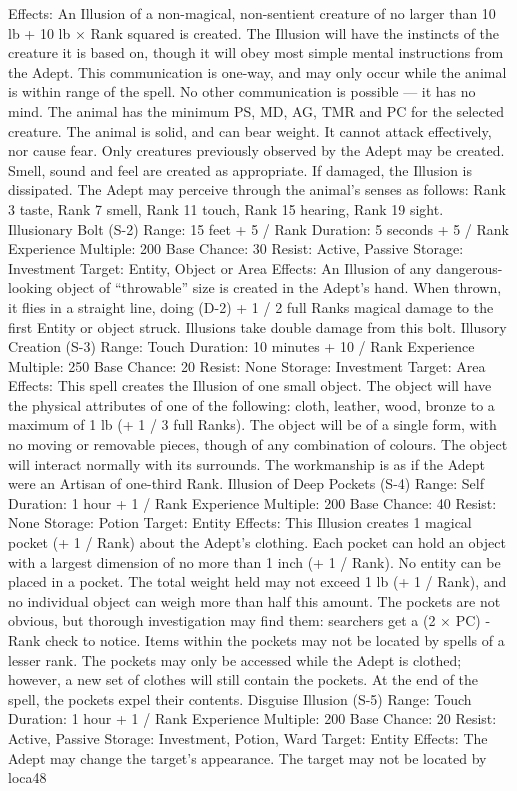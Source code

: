 \documentclass[a4paper]{article}
\begin{document}
\begin{multicols}{3}
Effects: An Illusion of a non-magical, non-sentient
creature of no larger than 10 lb + 10 lb × Rank
squared is created. The Illusion will have the instincts of the creature it is based on, though it will
obey most simple mental instructions from the
Adept. This communication is one-way, and may
only occur while the animal is within range of the
spell. No other communication is possible — it has
no mind. The animal has the minimum PS, MD,
AG, TMR and PC for the selected creature. The
animal is solid, and can bear weight. It cannot
attack effectively, nor cause fear. Only creatures
previously observed by the Adept may be created.
Smell, sound and feel are created as appropriate. If
damaged, the Illusion is dissipated. The Adept may
perceive through the animal’s senses as follows:
Rank 3 taste, Rank 7 smell, Rank 11 touch, Rank
15 hearing, Rank 19 sight.
Illusionary Bolt (S-2)
Range: 15 feet + 5 / Rank
Duration: 5 seconds + 5 / Rank
Experience Multiple: 200
Base Chance: 30%
Resist: Active, Passive
Storage: Investment
Target: Entity, Object or Area
Effects: An Illusion of any dangerous-looking
object of “throwable” size is created in the Adept’s
hand. When thrown, it flies in a straight line, doing
(D-2) + 1 / 2 full Ranks magical damage to the first
Entity or object struck. Illusions take double damage from this bolt.
Illusory Creation (S-3)
Range: Touch
Duration: 10 minutes + 10 / Rank
Experience Multiple: 250
Base Chance: 20%
Resist: None
Storage: Investment
Target: Area
Effects: This spell creates the Illusion of one small
object. The object will have the physical attributes
of one of the following: cloth, leather, wood,
bronze to a maximum of 1 lb (+ 1 / 3 full Ranks).
The object will be of a single form, with no moving or removable pieces, though of any combination of colours. The object will interact normally
with its surrounds. The workmanship is as if the
Adept were an Artisan of one-third Rank.
Illusion of Deep Pockets (S-4)
Range: Self
Duration: 1 hour + 1 / Rank
Experience Multiple: 200
Base Chance: 40%
Resist: None
Storage: Potion
Target: Entity
Effects: This Illusion creates 1 magical pocket (+ 1
/ Rank) about the Adept’s clothing. Each pocket
can hold an object with a largest dimension of no
more than 1 inch (+ 1 / Rank). No entity can be
placed in a pocket. The total weight held may not
exceed 1 lb (+ 1 / Rank), and no individual object
can weigh more than half this amount. The pockets
are not obvious, but thorough investigation may
find them: searchers get a (2 × PC) - Rank check to
notice. Items within the pockets may not be located
by spells of a lesser rank. The pockets may only be
accessed while the Adept is clothed; however, a
new set of clothes will still contain the pockets. At
the end of the spell, the pockets expel their contents.
Disguise Illusion (S-5)
Range: Touch
Duration: 1 hour + 1 / Rank
Experience Multiple: 200
Base Chance: 20%
Resist: Active, Passive
Storage: Investment, Potion, Ward
Target: Entity
Effects: The Adept may change the target’s appearance. The target may not be located by loca48


\end{multicols}
\end{document}
